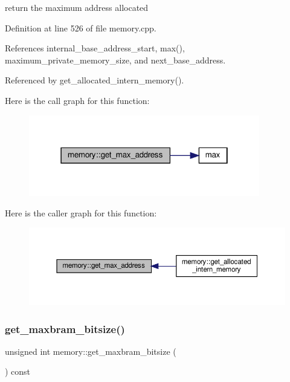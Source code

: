 return the maximum address allocated 



Definition at line 526 of file memory.\+cpp.



References internal\+\_\+base\+\_\+address\+\_\+start, max(), maximum\+\_\+private\+\_\+memory\+\_\+size, and next\+\_\+base\+\_\+address.



Referenced by get\+\_\+allocated\+\_\+intern\+\_\+memory().

Here is the call graph for this function\+:
\nopagebreak
\begin{figure}[H]
\begin{center}
\leavevmode
\includegraphics[width=286pt]{d8/d99/classmemory_ae371f1c8d9b33b71254ecb705d7ff51d_cgraph}
\end{center}
\end{figure}
Here is the caller graph for this function\+:
\nopagebreak
\begin{figure}[H]
\begin{center}
\leavevmode
\includegraphics[width=350pt]{d8/d99/classmemory_ae371f1c8d9b33b71254ecb705d7ff51d_icgraph}
\end{center}
\end{figure}
\mbox{\label{classmemory_a2c60a1b44b29221ddd9ac291afffd4d6}} 
\subsubsection{\texorpdfstring{get\+\_\+maxbram\+\_\+bitsize()}{get\_maxbram\_bitsize()}}
{\footnotesize\ttfamily unsigned int memory\+::get\+\_\+maxbram\+\_\+bitsize (\begin{DoxyParamCaption}{ }\end{DoxyParamCaption}) const\hspace{0.3cm}{\ttfamily [inline]}}



